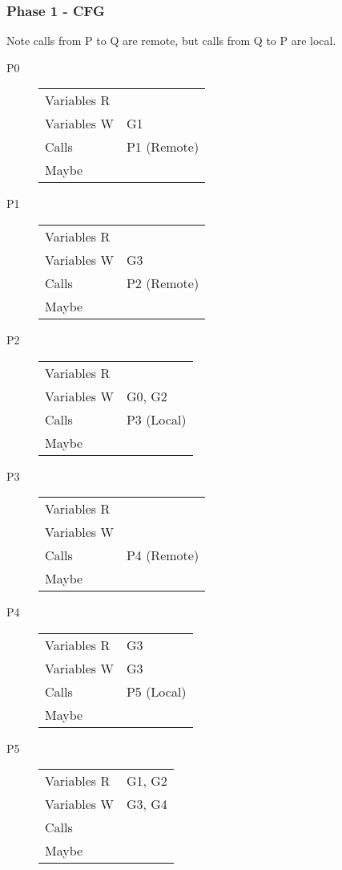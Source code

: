\documentclass{article}
\begin{document}
\subsubsection{Phase 1 - CFG}
Note calls from P to Q are remote, but calls from Q to P are local.
\begin{multicols}{2}
  \begin{description}
  \item[P0]
    \begin{tabular}{ll}
      Variables R & \\
      Variables W & G1 \\
      Calls       & P1 (Remote) \\
      Maybe       & \\
    \end{tabular}

  \item[P1]
    \begin{tabular}{ll}
      Variables R & \\
      Variables W & G3 \\
      Calls       & P2 (Remote) \\
      Maybe       & \\
    \end{tabular}

  \item[P2]
    \begin{tabular}{ll}
      Variables R & \\
      Variables W & G0, G2 \\
      Calls       & P3 (Local) \\
      Maybe       & \\
    \end{tabular}

  \item[P3]
    \begin{tabular}{ll}
      Variables R & \\
      Variables W & \\
      Calls       & P4 (Remote) \\
      Maybe       & \\
    \end{tabular}

  \item[P4]
    \begin{tabular}{ll}
      Variables R & G3 \\
      Variables W & G3 \\
      Calls       & P5 (Local) \\
      Maybe       & \\
    \end{tabular}

  \item[P5]
    \begin{tabular}{ll}
      Variables R & G1, G2 \\
      Variables W & G3, G4 \\
      Calls       & \\
      Maybe       & \\
    \end{tabular}
  \end{description}
\end{multicols}
\end{document}
